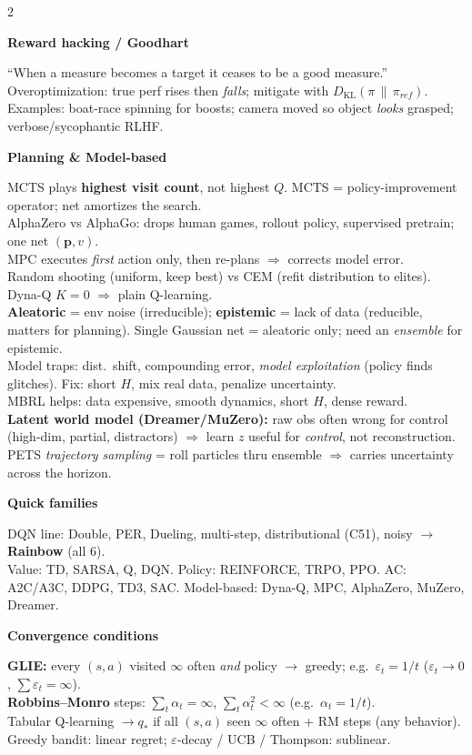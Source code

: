 \documentclass[a4paper]{article}
\newcommand{\hd}[1]{%
  \par\addvspace{3.6pt}%
  {\color{accent}\bfseries\small #1}\par
  \vspace{-4pt}{\color{accent!45}\rule{\linewidth}{0.4pt}}\par\vspace{1.2pt}}
\newcommand{\KL}[2]{D_{\mathrm{KL}}(#1\,\|\,#2)}
\begin{document}
\begin{multicols}{2}
\hd{Reward hacking / Goodhart}
``When a measure becomes a target it ceases to be a good measure.''\\
Overoptimization: true perf rises then \emph{falls}; mitigate with $\KL{\pi}{\pi_{ref}}$.\\
Examples: boat-race spinning for boosts; camera moved so object \emph{looks} grasped; verbose/sycophantic RLHF.

\hd{Planning \& Model-based}
MCTS plays \textbf{highest visit count}, not highest $Q$. MCTS = policy-improvement operator; net amortizes the search.\\
AlphaZero vs AlphaGo: drops human games, rollout policy, supervised pretrain; one net $(\mathbf p,v)$.\\
MPC executes \emph{first} action only, then re-plans $\Rightarrow$ corrects model error.\\
Random shooting (uniform, keep best) vs CEM (refit distribution to elites).\\
Dyna-Q $K{=}0$ $\Rightarrow$ plain Q-learning.\\
\textbf{Aleatoric} = env noise (irreducible); \textbf{epistemic} = lack of data (reducible, matters for planning). Single Gaussian net = aleatoric only; need an \emph{ensemble} for epistemic.\\
Model traps: dist.\ shift, compounding error, \emph{model exploitation} (policy finds glitches). Fix: short $H$, mix real data, penalize uncertainty.\\
MBRL helps: data expensive, smooth dynamics, short $H$, dense reward.\\
\textbf{Latent world model (Dreamer/MuZero):} raw obs often wrong for control (high-dim, partial, distractors) $\Rightarrow$ learn $z$ useful for \emph{control}, not reconstruction. PETS \emph{trajectory sampling} = roll particles thru ensemble $\Rightarrow$ carries uncertainty across the horizon.

\hd{Quick families}
DQN line: Double, PER, Dueling, multi-step, distributional (C51), noisy $\to$ \textbf{Rainbow} (all 6).\\
Value: TD, SARSA, Q, DQN. Policy: REINFORCE, TRPO, PPO. AC: A2C/A3C, DDPG, TD3, SAC. Model-based: Dyna-Q, MPC, AlphaZero, MuZero, Dreamer.

\hd{Convergence conditions}
\textbf{GLIE:} every $(s,a)$ visited $\infty$ often \emph{and} policy $\to$ greedy; e.g.\ $\varepsilon_t{=}1/t$ ($\varepsilon_t{\to}0$, $\sum\varepsilon_t{=}\infty$).\\
\textbf{Robbins--Monro} steps: $\sum_t\alpha_t{=}\infty$, $\sum_t\alpha_t^2{<}\infty$ (e.g.\ $\alpha_t{=}1/t$).\\
Tabular Q-learning $\to q_*$ if all $(s,a)$ seen $\infty$ often + RM steps (any behavior).\\
Greedy bandit: linear regret; $\varepsilon$-decay / UCB / Thompson: sublinear.


\end{multicols}
\end{document}
